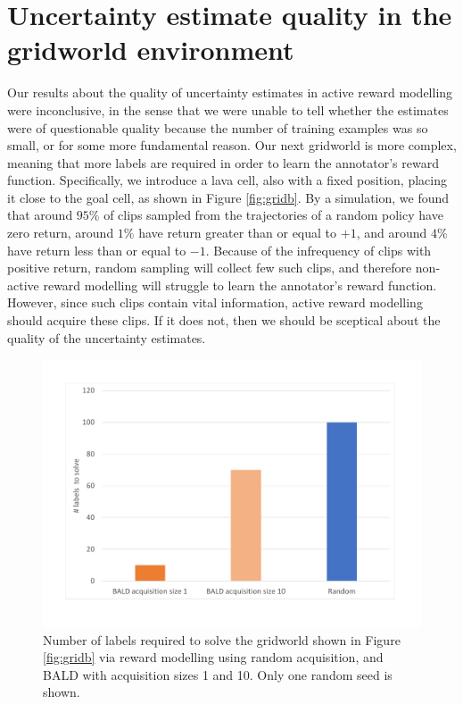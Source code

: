 \documentclass[11pt, a4paper, bibliography=totoc]{report}
\begin{document}
\section{Uncertainty estimate quality in the gridworld environment}
Our results about the quality of uncertainty estimates in active reward modelling were inconclusive, in the sense that we were unable to tell whether the estimates were of questionable quality because the number of training examples was so small, or for some more fundamental reason. Our next gridworld is more complex, meaning that more labels are required in order to learn the annotator's reward function. Specifically, we introduce a lava cell, also with a fixed position, placing it close to the goal cell, as shown in Figure \ref{fig:gridb}. By a simulation, we found that around $ 95\% $ of clips sampled from the trajectories of a random policy have zero return, around $ 1\% $ have return greater than or equal to $ +1 $, and around $ 4\% $ have return less than or equal to $ -1 $. Because of the infrequency of clips with positive return, random sampling will collect few such clips, and therefore non-active reward modelling will struggle to learn the annotator's reward function. However, since such clips contain vital information, active reward modelling should acquire these clips. If it does not, then we should be sceptical about the quality of the uncertainty estimates.

\begin{figure}[h]
	\centering
	\includegraphics[width=\textwidth]{grid_medium}
	\caption{Number of labels required to solve the gridworld shown in Figure \ref{fig:gridb} via reward modelling using random acquisition, and BALD with acquisition sizes 1 and 10. Only one random seed is shown.}
	\label{fig:grid_medium}
\end{figure}
\end{document}
